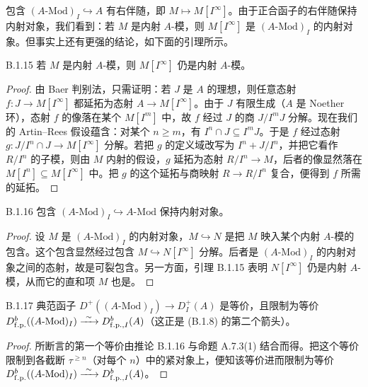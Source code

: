 包含 $(A\text{-}\mathrm{Mod})_I\hookrightarrow A$ 有右伴随，即 $M\mapsto M[I^\infty]$。由于正合函子的右伴随保持内射对象，我们看到：若 $M$ 是内射 $A$-模，则 $M[I^\infty]$ 是 $(A\text{-}\mathrm{Mod})_I$ 的内射对象。但事实上还有更强的结论，如下面的引理所示。

\begin{lem}{B.1.15}\label{thm:a4-18-19}
若 $M$ 是内射 $A$-模，则 $M[I^\infty]$ 仍是内射 $A$-模。
\end{lem}
\begin{proof}
由 Baer 判别法，只需证明：若 $J$ 是 $A$ 的理想，则任意态射 $f:J\to M[I^\infty]$ 都延拓为态射 $A\to M[I^\infty]$。由于 $J$ 有限生成（$A$ 是 Noether 环），态射 $f$ 的像落在某个 $M[I^m]$ 中，故 $f$ 经过 $J$ 的商 $J/I^mJ$ 分解。现在我们的 Artin--Rees 假设蕴含：对某个 $n\ge m$，有 $I^n\cap J\subseteq I^mJ$。于是 $f$ 经过态射 $g:J/I^n\cap J\to M[I^\infty]$ 分解。若把 $g$ 的定义域改写为 $I^n+J/I^n$，并把它看作 $R/I^n$ 的子模，则由 $M$ 内射的假设，$g$ 延拓为态射 $R/I^n\to M$，后者的像显然落在 $M[I^n]\subseteq M[I^\infty]$ 中。把 $g$ 的这个延拓与商映射 $R\to R/I^n$ 复合，便得到 $f$ 所需的延拓。
\end{proof}

\begin{cor}{B.1.16}\label{thm:a4-18-20}
包含 $(A\text{-}\mathrm{Mod})_I\hookrightarrow A\text{-}\mathrm{Mod}$ 保持内射对象。
\end{cor}
\begin{proof}
设 $M$ 是 $(A\text{-}\mathrm{Mod})_I$ 的内射对象，$M\hookrightarrow N$ 是把 $M$ 映入某个内射 $A$-模的包含。这个包含显然经过包含 $M\hookrightarrow N[I^\infty]$ 分解。后者是 $(A\text{-}\mathrm{Mod})_I$ 的内射对象之间的态射，故是可裂包含。另一方面，引理 B.1.15 表明 $N[I^\infty]$ 仍是内射 $A$-模，从而它的直和项 $M$ 也是。
\end{proof}

\begin{prop}{B.1.17}\label{thm:a4-18-21}
典范函子 $D^+((A\text{-}\mathrm{Mod})_I)\to D^+_I(A)$ 是等价，且限制为等价 $D^b_{\mathrm{f.p.}}((A\text{-}\mathrm{Mod})_I)\xrightarrow{\ \sim\ } D^b_{\mathrm{f.p.},I}(A)$（这正是 (B.1.8) 的第二个箭头）。
\end{prop}
\begin{proof}
所断言的第一个等价由推论 B.1.16 与命题 A.7.3(1) 结合而得。把这个等价限制到各截断 $\tau^{\ge n}$（对每个 $n$）中的紧对象上，便知该等价进而限制为等价 $D^b_{\mathrm{f.p.}}((A\text{-}\mathrm{Mod})_I)\xrightarrow{\ \sim\ } D^b_{\mathrm{f.p.},I}(A)$。
\end{proof}

